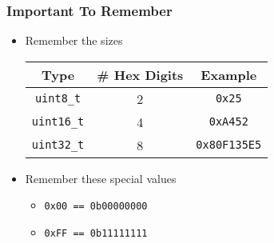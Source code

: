 \begin{frame}
  \frametitle{Important To Remember}
  \begin{itemize}
    \item Remember the sizes
          \begin{center}
            \begin{tabular}{ccc}
              \toprule
              \textbf{Type} & \textbf{\# Hex Digits} & \textbf{Example} \\
              \midrule
              \texttt{uint8\_t} & 2 & \texttt{0x25} \\
              \texttt{uint16\_t} & 4 & \texttt{0xA452} \\
              \texttt{uint32\_t} & 8 & \texttt{0x80F135E5} \\
              \bottomrule
            \end{tabular}
          \end{center}
          \vskip2mm
    \item Remember these special values
          \begin{itemize}
            \item \texttt{0x00 == 0b00000000}
            \item \texttt{0xFF == 0b11111111}
          \end{itemize}
  \end{itemize}
\end{frame}
